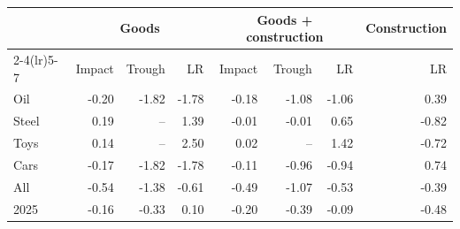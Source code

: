 \begin{tabular}{lrrrrrrr}
\toprule
 & \multicolumn{3}{c}{Goods} & \multicolumn{3}{c}{Goods + construction} & Construction \\
\cmidrule(lr){2-4}\cmidrule(lr){5-7}
 & Impact & Trough & LR & Impact & Trough & LR & LR \\
\midrule
Oil & -0.20 & -1.82 & -1.78 & -0.18 & -1.08 & -1.06 & 0.39 \\
Steel & 0.19 & -- & 1.39 & -0.01 & -0.01 & 0.65 & -0.82 \\
Toys & 0.14 & -- & 2.50 & 0.02 & -- & 1.42 & -0.72 \\
Cars & -0.17 & -1.82 & -1.78 & -0.11 & -0.96 & -0.94 & 0.74 \\
All & -0.54 & -1.38 & -0.61 & -0.49 & -1.07 & -0.53 & -0.39 \\
2025 & -0.16 & -0.33 & 0.10 & -0.20 & -0.39 & -0.09 & -0.48 \\
\bottomrule
\end{tabular}
